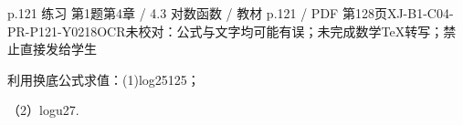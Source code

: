 \begin{bankitem}{p.121 练习 第1题}{第4章 / 4.3 对数函数 / 教材 p.121 / PDF 第128页}{XJ-B1-C04-PR-P121-Y0218}{OCR未校对：公式与文字均可能有误；未完成数学TeX转写；禁止直接发给学生}
\begin{ocrdraft}
\par
利用换底公式求值：(1)log25125；
\par
（2）logu27.
\end{ocrdraft}
\end{bankitem}
